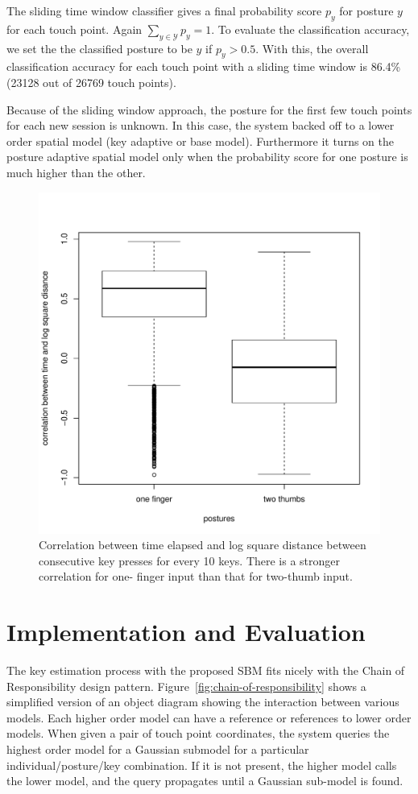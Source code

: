 \documentclass{sigchi}
\begin{document}
The sliding time window classifier gives a final probability score $p_y$ for posture
$y$ for each touch point. Again $\displaystyle\sum_{y\in \mathcal{Y}}p_y = 1$. To evaluate the classification accuracy, we set the the
classified posture to be $y$ if $p_y > 0.5$. With this, the overall classification 
accuracy for each touch point with a sliding time window
is 86.4\% (23128 out of 26769 touch points).

Because of the sliding window approach, the posture for the first few touch points  
for each new session is unknown. In this case, the system backed off to a lower order spatial 
model (key adaptive or base model). Furthermore  it turns on the posture 
adaptive spatial model only when the probability score for one posture is much 
higher than the other.

\begin{figure}[tb]
  \centering
  \includegraphics[width=0.8\columnwidth]{figures/boxplot.pdf}
  \caption{Correlation between time elapsed and log square distance between
  consecutive key presses for every 10 keys. There is a stronger correlation for
  one- finger input than that for two-thumb input.}
  \label{fig:boxplot}
\end{figure}

\section{Implementation and Evaluation}
The key estimation process with the proposed SBM fits nicely with the
Chain of Responsibility design pattern.
Figure~\ref{fig:chain-of-responsibility} shows a simplified version of an object
diagram showing the interaction between various models. Each higher order model can
have a reference or references to lower order models. When given a pair of touch
point coordinates, the system queries the highest order model for a Gaussian
submodel for a particular individual/posture/key combination. If it is not present, 
the higher model calls the lower model, and the
query propagates until a Gaussian sub-model is found. 
\end{document}
